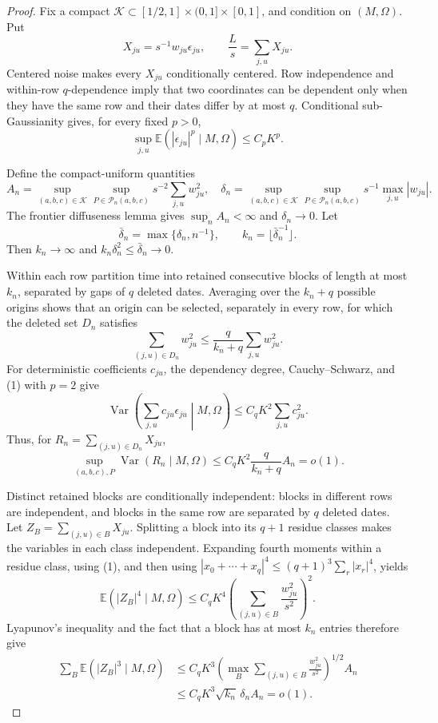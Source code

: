 \documentclass{article}
\begin{document}
\begin{proof}
Fix a compact \(\mathcal K\subset[1/2,1]\times(0,1]\times[0,1]\), and condition on \((M,\Omega)\).  Put
\[
 X_{ju}=s^{-1}w_{ju}\epsilon_{ju},
 \qquad \frac Ls=\sum_{j,u}X_{ju}.
\]
Centered noise makes every \(X_{ju}\) conditionally centered.  Row independence and within-row \(q\)-dependence imply that two coordinates can be dependent only when they have the same row and their dates differ by at most \(q\).  Conditional sub-Gaussianity gives, for every fixed \(p>0\),
\[
 \sup_{j,u}\mathbb E(|\epsilon_{ju}|^p\mid M,\Omega)
 \le C_pK^p.
 \tag{1}
\]

Define the compact-uniform quantities
\[
 A_n=\sup_{(a,b,c)\in\mathcal K}\sup_{P\in\mathcal P_n(a,b,c)}
 s^{-2}\sum_{j,u}w_{ju}^2,
 \quad
 \delta_n=\sup_{(a,b,c)\in\mathcal K}\sup_{P\in\mathcal P_n(a,b,c)}
 s^{-1}\max_{j,u}|w_{ju}|.
\]
The frontier diffuseness lemma gives \(\sup_nA_n<\infty\) and \(\delta_n\to0\).  Let
\[
 \bar\delta_n=\max\{\delta_n,n^{-1}\},
 \qquad k_n=\lfloor\bar\delta_n^{-1}\rfloor.
\]
Then \(k_n\to\infty\) and \(k_n\delta_n^2\le\bar\delta_n\to0\).

Within each row partition time into retained consecutive blocks of length at most \(k_n\), separated by gaps of \(q\) deleted dates.  Averaging over the \(k_n+q\) possible origins shows that an origin can be selected, separately in every row, for which the deleted set \(D_n\) satisfies
\[
 \sum_{(j,u)\in D_n}w_{ju}^2
 \le\frac{q}{k_n+q}\sum_{j,u}w_{ju}^2.
 \tag{2}
\]
For deterministic coefficients \(c_{ju}\), the dependency degree, Cauchy--Schwarz, and (1) with \(p=2\) give
\[
 \operatorname{Var}\!\left(\sum_{j,u}c_{ju}\epsilon_{ju}\middle|M,\Omega\right)
 \le C_qK^2\sum_{j,u}c_{ju}^2.
 \tag{3}
\]
Thus, for \(R_n=\sum_{(j,u)\in D_n}X_{ju}\),
\[
 \sup_{(a,b,c),P}\operatorname{Var}(R_n\mid M,\Omega)
 \le C_qK^2\frac{q}{k_n+q}A_n=o(1).
 \tag{4}
\]

Distinct retained blocks are conditionally independent: blocks in different rows are independent, and blocks in the same row are separated by \(q\) deleted dates.  Let \(Z_B=\sum_{(j,u)\in B}X_{ju}\).  Splitting a block into its \(q+1\) residue classes makes the variables in each class independent.  Expanding fourth moments within a residue class, using (1), and then using \(|x_0+\cdots+x_q|^4\le(q+1)^3\sum_r|x_r|^4\), yields
\[
 \mathbb E(|Z_B|^4\mid M,\Omega)
 \le C_qK^4\left(\sum_{(j,u)\in B}\frac{w_{ju}^2}{s^2}\right)^2.
 \tag{5}
\]
Lyapunov's inequality and the fact that a block has at most \(k_n\) entries therefore give
\[
 \begin{aligned}
 \sum_B\mathbb E(|Z_B|^3\mid M,\Omega)
 &\le C_qK^3
 \left(\max_B\sum_{(j,u)\in B}\frac{w_{ju}^2}{s^2}\right)^{1/2}A_n\\
 &\le C_qK^3\sqrt{k_n}\,\delta_nA_n=o(1).
 \end{aligned}
 \tag{6}
\]


\end{proof}
\end{document}
